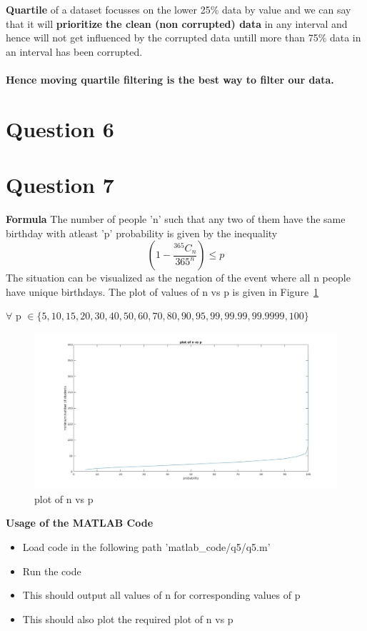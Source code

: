\documentclass[12pt]{article}
\begin{document}
\textbf{Quartile} of a dataset focusses on the lower 25\% data by value and we can say that it will \textbf{prioritize} \textbf{the clean (non corrupted) data} in any interval and hence will not get influenced by the corrupted data untill more than 75\% data in an interval has been corrupted.
\\ \\
\textbf{Hence moving quartile filtering is the best way to filter our data.}

\newpage
\section{Question 6}




\newpage
\section{Question 7}
\textbf{Formula}
\newline
The number of people 'n' such that any two of them have the same birthday with atleast 'p' probability is given by the inequality
$$\left(1-\frac{^{365}C_n}{365^n}\right) \leq p$$
The situation can be visualized as the negation of the event where all n people have unique birthdays.
\newline
The plot of values of n vs p is given in Figure~\ref{fig:7.1}
\begin{flushright}
$\forall$ p $\in \{5, 10, 15, 20, 30, 40, 50, 60, 70, 80, 90, 95, 99, 99.99, 99.9999, 100\}$
\end{flushright}
\begin{figure} [h!]
\includegraphics[width=\linewidth]{plot.jpg}
\caption{plot of n vs p}
\label{fig:7.1}
\end{figure}
\textbf{Usage of the MATLAB Code}
\begin{itemize}
\item Load code in the following path 'matlab\_code/q5/q5.m'
\item Run the code
\item This should output all values of n for corresponding values of p
\item This should also plot the required plot of n vs p
\end{itemize}
\end{document}
